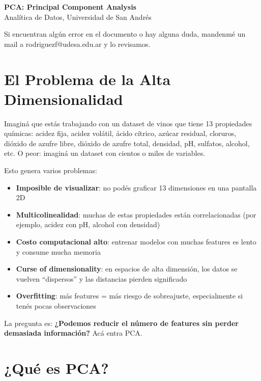 \documentclass[12pt]{article}
\begin{document}
\begin{center}
  {\LARGE \textbf{PCA: Principal Component Analysis}}\\[0.5em]
  {Analítica de Datos, Universidad de San Andrés}
\end{center}

\vspace{1em}

Si encuentran algún error en el documento o hay alguna duda, mandenmé un mail a rodriguezf@udesa.edu.ar y lo revisamos.

\section{El Problema de la Alta Dimensionalidad}

Imaginá que estás trabajando con un dataset de vinos que tiene 13 propiedades químicas: acidez fija, acidez volátil, ácido cítrico, azúcar residual, cloruros, dióxido de azufre libre, dióxido de azufre total, densidad, pH, sulfatos, alcohol, etc. O peor: imaginá un dataset con cientos o miles de variables.

\vspace{0.5em}

Esto genera varios problemas:

\begin{itemize}
    \item \textbf{Imposible de visualizar}: no podés graficar 13 dimensiones en una pantalla 2D
    \item \textbf{Multicolinealidad}: muchas de estas propiedades están correlacionadas (por ejemplo, acidez con pH, alcohol con densidad)
    \item \textbf{Costo computacional alto}: entrenar modelos con muchas features es lento y consume mucha memoria
    \item \textbf{Curse of dimensionality}: en espacios de alta dimensión, los datos se vuelven ``dispersos'' y las distancias pierden significado
    \item \textbf{Overfitting}: más features = más riesgo de sobreajuste, especialmente si tenés pocas observaciones
\end{itemize}

La pregunta es: \textbf{¿Podemos reducir el número de features sin perder demasiada información?} Acá entra PCA.

\section{¿Qué es PCA?}
\end{document}
